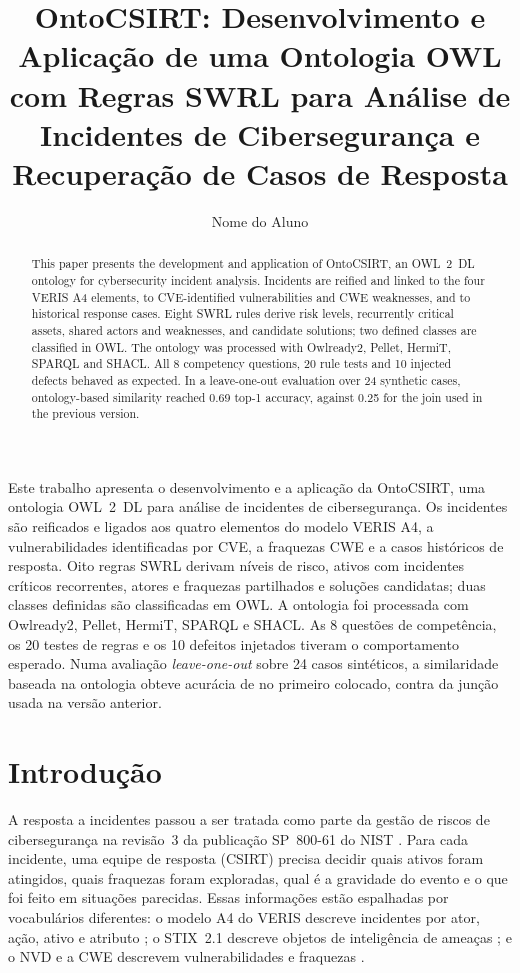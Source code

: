 \documentclass[12pt]{article}
\title{OntoCSIRT: Desenvolvimento e Aplicação de uma Ontologia OWL com Regras SWRL para Análise de Incidentes de Cibersegurança e Recuperação de Casos de Resposta}
\author{Nome do Aluno\inst{1}}
\begin{document}
\maketitle

\begin{abstract}
This paper presents the development and application of OntoCSIRT, an OWL~2~DL ontology for cybersecurity incident analysis. Incidents are reified and linked to the four VERIS A4 elements, to CVE-identified vulnerabilities and CWE weaknesses, and to historical response cases. Eight SWRL rules derive risk levels, recurrently critical assets, shared actors and weaknesses, and candidate solutions; two defined classes are classified in OWL. The ontology was processed with Owlready2, Pellet, HermiT, SPARQL and SHACL. All 8 competency questions, 20 rule tests and 10 injected defects behaved as expected. In a leave-one-out evaluation over 24 synthetic cases, ontology-based similarity reached 0.69 top-1 accuracy, against 0.25 for the join used in the previous version.
\end{abstract}

\begin{resumo}
Este trabalho apresenta o desenvolvimento e a aplicação da OntoCSIRT, uma ontologia OWL~2~DL para análise de incidentes de cibersegurança. Os incidentes são reificados e ligados aos quatro elementos do modelo VERIS A4, a vulnerabilidades identificadas por CVE, a fraquezas CWE e a casos históricos de resposta. Oito regras SWRL derivam níveis de risco, ativos com incidentes críticos recorrentes, atores e fraquezas partilhados e soluções candidatas; duas classes definidas são classificadas em OWL. A ontologia foi processada com Owlready2, Pellet, HermiT, SPARQL e SHACL. As 8 questões de competência, os 20 testes de regras e os 10 defeitos injetados tiveram o comportamento esperado. Numa avaliação \emph{leave-one-out} sobre 24 casos sintéticos, a similaridade baseada na ontologia obteve acurácia de \accVseven{} no primeiro colocado, contra \accVsix{} da junção usada na versão anterior.
\end{resumo}

\section{Introdução}

A resposta a incidentes passou a ser tratada como parte da gestão de riscos de cibersegurança na revisão~3 da publicação SP~800-61 do NIST \cite{nist80061r3}. Para cada incidente, uma equipe de resposta (CSIRT) precisa decidir quais ativos foram atingidos, quais fraquezas foram exploradas, qual é a gravidade do evento e o que foi feito em situações parecidas. Essas informações estão espalhadas por vocabulários diferentes: o modelo A4 do VERIS descreve incidentes por ator, ação, ativo e atributo \cite{veris}; o STIX~2.1 descreve objetos de inteligência de ameaças \cite{stix21}; e o NVD e a CWE descrevem vulnerabilidades e fraquezas \cite{nvd,cwe}.
\end{document}
